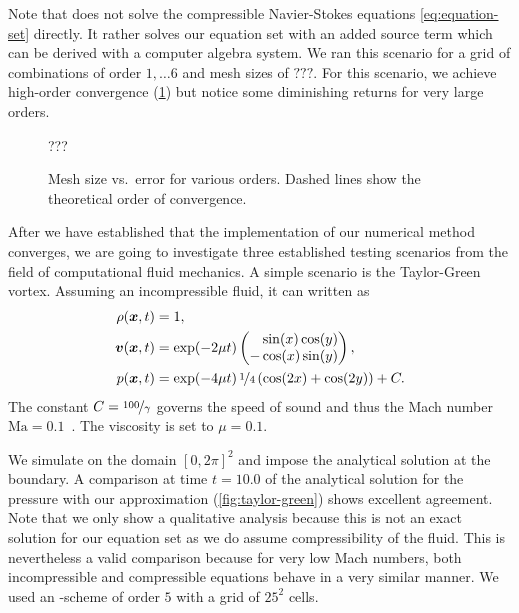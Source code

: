 \documentclass[runningheads]{llncs}
\begin{document}
Note that  does not solve the compressible Navier-Stokes equations \cref{eq:equation-set} directly.
It rather solves our equation set with an added source term which can be derived with a computer algebra system.
We ran this scenario for a grid of combinations of order $1, \ldots 6$ and mesh sizes of $??? $.
For this scenario, we achieve high-order convergence (\ref{fig:convergence-test}) but notice some diminishing returns for very large orders.
\begin{figure}[htb]
  \centering
  ??? 
  \caption{\label{fig:convergence-test}Mesh size vs.\ error for various orders.
  Dashed lines show the theoretical order of convergence.}
\end{figure}

After we have established that the implementation of our numerical method converges, we are going to investigate three established testing scenarios from the field of computational fluid mechanics.
A simple scenario is the Taylor-Green vortex.
Assuming an incompressible fluid, it can written as
\begin{align}
  \label{eq:taylor-green}
  \begin{split}
  \rho(\bm{x}, t) &= 1,\\
  \bm{v}(\bm{x}, t) &= \exp(-2 \mu t)
  \begin{pmatrix}
    \phantom{-}\sin(x) \cos(y) \\
- \cos(x) \sin(y) 
    \end{pmatrix}, \\
  p(\bm{x}, t) &= \exp(-4 \mu t) \, \nicefrac{1}{4} \left( \cos(2x) + \cos(2y) \right) + C.
  \end{split}
\end{align}
The constant $C = \nicefrac{100}{\gamma}$ governs the speed of sound and thus the Mach number $\text{Ma} = 0.1$~\cite{dumbser2016high}. The viscosity is set to $\mu = 0.1$. 

We simulate on the domain $[0,2\pi]^2$ and impose the analytical solution at the boundary.
A comparison at time $t = 10.0$ of the analytical solution for the pressure with our approximation (\cref{fig:taylor-green}) shows excellent agreement.
Note that we only show a qualitative analysis because this is not an exact solution for our equation set as we do assume compressibility of the fluid.
This is nevertheless a valid comparison because for very low Mach numbers, both incompressible and compressible equations behave in a very similar manner.
We used an \aderdg{}-scheme of order $5$ with a grid of $25^2$ cells.
\end{document}
